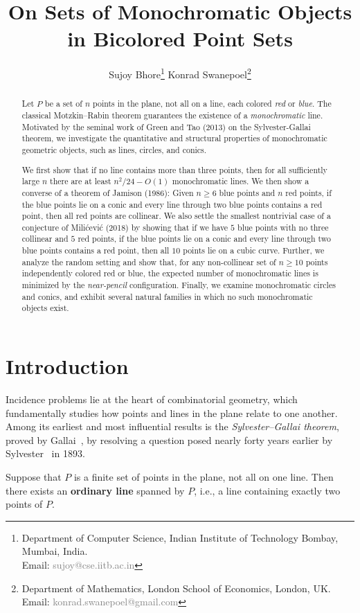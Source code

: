 \documentclass[a4paper,11pt,leqno]{article}
\title{On Sets of Monochromatic Objects in Bicolored Point Sets}
\author{
Sujoy Bhore\thanks{Department of Computer Science, Indian Institute of Technology Bombay, Mumbai, India.\\ Email: \textcolor{gray}{sujoy@cse.iitb.ac.in}}
\quad
Konrad Swanepoel\thanks{Department of Mathematics, London School of Economics, London, UK.\\ Email: \textcolor{gray}{konrad.swanepoel@gmail.com}}
}
\date{}
\begin{document}
\maketitle

\begin{abstract}
Let $P$ be a set of $n$ points in the plane, not all on a line, each colored \emph{red} or \emph{blue}. 
The classical Motzkin--Rabin theorem guarantees the existence of a \emph{monochromatic} line. 
Motivated by the seminal work of Green and Tao (2013) on the Sylvester-Gallai theorem, we investigate the quantitative and structural properties of monochromatic geometric objects, such as lines, circles, and conics.

We first show that if no line contains more than three points, then for all sufficiently large $n$ there are at least $n^{2}/24 - O(1)$ monochromatic lines.  
We then show a converse of a theorem of Jamison (1986): Given $n\ge 6$ blue points and $n$ red points, if the blue points lie on a conic and every line through two blue points contains a red point, then all red points are collinear. 
We also settle the smallest nontrivial case of a conjecture of Mili\'cevi\'c (2018) by showing that if we have $5$ blue points with no three collinear and $5$ red points, if the blue points lie on a conic and every line through two blue points contains a red point, then all $10$ points lie on a cubic curve.
Further, we analyze the random setting and show that, for any non-collinear set of $n\ge 10$ points independently colored red or blue, the expected number of monochromatic lines is minimized by the \emph{near-pencil} configuration. Finally, we examine monochromatic circles and conics, and exhibit several natural families in which no such monochromatic objects exist.
\end{abstract}


\section{Introduction}
Incidence problems lie at the heart of combinatorial geometry, which fundamentally studies how points and lines in the plane relate to one another.
Among its earliest and most influential results is the \emph{Sylvester–Gallai theorem}, proved by Gallai~\cite{gallai1944solution}, by resolving a question posed nearly forty years earlier by Sylvester~\cite{sylvester1893mathematical} in 1893.

\begin{theorem}\label{thm:SG}
Suppose that $P$ is a finite set of points in the plane, not all on one line.  
Then there exists an \textbf{ordinary line} spanned by $P$, i.e., a line containing exactly two points of $P$.
\end{theorem}
\end{document}
